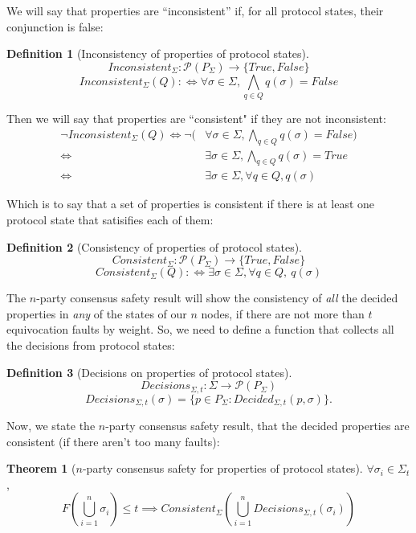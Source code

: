 \documentclass{article}
\theoremstyle{definition}
\newtheorem{thm}{Theorem}
\newtheorem{defn}{Definition}[section]
\begin{document}
We will say that properties are ``inconsistent'' if, for all protocol states, their conjunction is false:

\begin{defn}[Inconsistency of properties of protocol states]
$$ Inconsistent_\Sigma : \mathcal{P}(P_\Sigma) \to \{True, False\}$$
$$ Inconsistent_\Sigma(Q): \Leftrightarrow \forall \sigma \in \Sigma, \bigwedge_{q \in Q} q(\sigma) = False $$
\end{defn}

Then we will say that properties are ``consistent" if they are not inconsistent:
\begin{align}
\neg Inconsistent_\Sigma(Q) \iff \neg (&\forall \sigma \in \Sigma, \bigwedge_{q \in Q} q(\sigma) = False) \\
\iff &\exists \sigma \in \Sigma, \bigwedge_{q \in Q} q(\sigma) = True \\
\iff &\exists \sigma \in \Sigma, \forall q \in Q, q(\sigma)
\end{align}

Which is to say that a set of properties is consistent if there is at least one protocol state that satisifies each of them:

\begin{defn}[Consistency of properties of protocol states]
$$ Consistent_\Sigma : \mathcal{P}(P_\Sigma) \to \{True, False\}$$
$$ Consistent_\Sigma(Q): \Leftrightarrow \exists \sigma \in \Sigma, \forall q \in Q, ~ q(\sigma)$$
\end{defn}

The $n$-party consensus safety result will show the consistency of \emph{all} the decided properties in \emph{any} of the states of our $n$ nodes, if there are not more than $t$ equivocation faults by weight. So, we need to define a function that collects all the decisions from protocol states:

\begin{defn}[Decisions on properties of protocol states]
$$ Decisions_{\Sigma,t} : \Sigma \to \mathcal{P}(P_\Sigma)$$
$$ Decisions_{\Sigma,t}(\sigma)= \{ p \in P_\Sigma: Decided_{\Sigma, t}(p,\sigma) \}.$$
\end{defn}

Now, we state the $n$-party consensus safety result, that the decided properties are consistent (if there aren't too many faults):

\begin{thm}[$n$-party consensus safety for properties of protocol states]
\label{thm:nparty_consensus_safety}
$\forall \sigma_i \in \Sigma_t$,
$$
F(\bigcup_{i=1}^n \sigma_i) \leq t \implies Consistent_\Sigma(\bigcup_{i=1}^n Decisions_{\Sigma,t}(\sigma_i))
$$
\end{thm}
\end{document}
